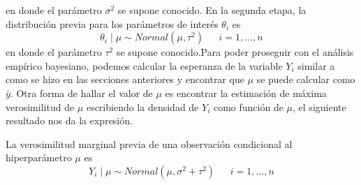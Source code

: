 \documentclass[10pt,openright]{book}\usepackage[]{graphicx}\usepackage[]{color}
\begin{document}
en donde el par\'ametro $\sigma^2$ se supone conocido. En la segunda etapa, la distribuci\'on previa para los par\'ametros de inter\'es $\theta_i$ es
\begin{equation*}
\theta_i \mid \mu \sim Normal(\mu, \tau^2) \ \ \ \ \ \ \ i=1,\ldots,n
\end{equation*}
en donde el par\'ametro $\tau^2$ se supone conocido.Para poder proseguir con el an\'alisis emp\'irico bayesiano, podemos calcular la esperanza de la variable $Y_i$ similar a como se hizo en las secciones anteriores y encontrar que $\mu$ se puede calcular como $\bar{y}$. Otra forma de hallar el valor de $\mu$ es encontrar la estimaci\'on de m\'axima verosimilitud de $\mu$ escribiendo la densidad de $Y_i$ como funci\'on de $\mu$, el siguiente resultado nos da la expresi\'on.

\begin{Res}
La verosimilitud marginal previa de una observaci\'on condicional al hiperpar\'ametro $\mu$ es
\begin{equation*}
Y_i \mid \mu\sim Normal(\mu,\sigma^2+ \tau^2) \ \ \ \ \ \ \ i=1,\ldots,n
\end{equation*}
\end{Res}
\end{document}
